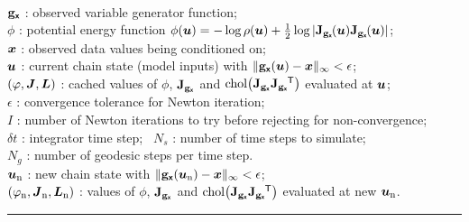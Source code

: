 \begin{algorithmic}
\small
    \Require\\
    ${\mathbf{g}}_{\boldsymbol{\mathsf{x}}}$ : observed variable generator function; \\
    $\phi$ : potential energy function $\phi(\vct{u}) = -\log\rho(\vct{u}) + \frac{1}{2}\log|\jacob{\genfunc_{\rvct{x}}}{\vct{u}}\jacob{\genfunc_{\rvct{x}}}{\vct{u}}|$;\\
    $\boldsymbol{x}$ : observed data values being conditioned on; \\
    $\boldsymbol{u}$ : current chain state (model inputs) with $\Vert{\mathbf{g}}_{\boldsymbol{\mathsf{x}}}(\boldsymbol{u}) - \boldsymbol{x}\Vert_\infty < \epsilon$;\\%
    $(\varphi, \boldsymbol{J}, \boldsymbol{L})$ : cached values of $\phi$, $\mathbf{J}_{{\mathbf{g}}_{\boldsymbol{\mathsf{x}}}}$ and $\chol\lpa\jacobian{\genfunc_{\rvct{x}}}\jacobian{\genfunc_{\rvct{x}}}\phantom{}\tr\rpa$ evaluated at $\boldsymbol{u}$; \\
    $\epsilon$ : convergence tolerance for Newton iteration;\\
    $I$ : number of Newton iterations to try before rejecting for non-convergence;\\
    $\delta t$ : integrator time step;~
    $N_s$ : number of time steps to simulate; \\
    $N_g$ : number of geodesic steps per time step.
    \Ensure\\
    $\boldsymbol{u}_{\mathrm{n}}$ : new chain state with $\Vert{\mathbf{g}}_{\boldsymbol{\mathsf{x}}}(\boldsymbol{u}_{\textrm{n}}) - \boldsymbol{x}\Vert_\infty < \epsilon$; \\%
    $(\varphi_{\textrm{n}},\boldsymbol{J}_{\mathrm{n}}, \boldsymbol{L}_{\mathrm{n}})$ : values of $\phi$, $\mathbf{J}_{{\mathbf{g}}_{\boldsymbol{\mathsf{x}}}}$ and $\chol\lpa\jacobian{\genfunc_{\rvct{x}}}\jacobian{\genfunc_{\rvct{x}}}\phantom{}\tr\rpa$ evaluated at new $\boldsymbol{u}_{\textrm{n}}$.
\end{algorithmic}
\vspace{1mm}
\hrule
\vspace{-2mm}
